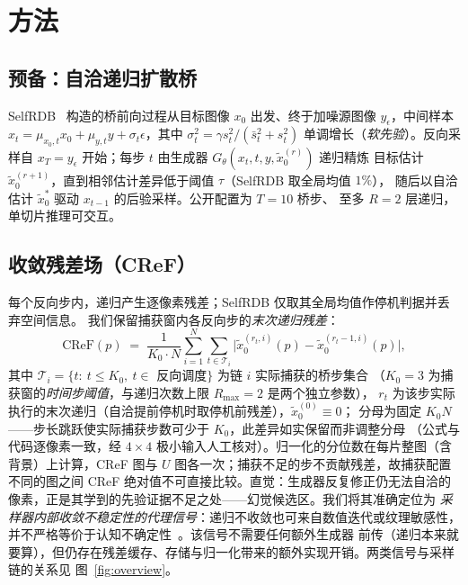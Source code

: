 \documentclass[11pt]{article}
\begin{document}


\section{方法}
\label{sec:method}

\subsection{预备：自洽递归扩散桥}
SelfRDB~\cite{arslan2025selfrdb} 构造的桥前向过程从目标图像 $x_0$ 出发、终于加噪源图像
$y_\epsilon$，中间样本 $x_t=\mu_{x_0,t}x_0+\mu_{y,t}y+\sigma_t\epsilon$，其中
$\sigma_t^2=\gamma s_t^2/(\bar s_t^2+s_t^2)$ 单调增长（\emph{软先验}）。反向采样自
$x_T=y_\epsilon$ 开始；每步 $t$ 由生成器 $G_\theta(x_t,t,y,\tilde x_0^{(r)})$ 递归精炼
目标估计 $\tilde x_0^{(r+1)}$，直到相邻估计差异低于阈值 $\tau$（SelfRDB 取全局均值 $1\%$），
随后以自洽估计 $\tilde x_0^{\ast}$ 驱动 $x_{t-1}$ 的后验采样。公开配置为 $T{=}10$ 桥步、
至多 $R{=}2$ 层递归，单切片推理可交互。

\subsection{收敛残差场（CReF）}
每个反向步内，递归产生逐像素残差；SelfRDB 仅取其全局均值作停机判据并丢弃空间信息。
我们保留捕获窗内各反向步的\emph{末次递归残差}：
\begin{equation}
  \mathrm{CReF}(p) \;=\; \frac{1}{K_0\cdot N}\sum_{i=1}^{N}\sum_{t\in\mathcal T_i}
      \bigl\lvert \tilde x_0^{(r_t,i)}(p)-\tilde x_0^{(r_t-1,i)}(p)\bigr\rvert ,
  \label{eq:cref}
\end{equation}
其中 $\mathcal T_i=\{t:\ t\le K_0,\ t\in$ 反向调度$\}$ 为链 $i$ 实际捕获的桥步集合
（$K_0{=}3$ 为捕获窗的\emph{时间步阈值}，与递归次数上限 $R_{\max}{=}2$ 是两个独立参数），
$r_t$ 为该步实际执行的末次递归（自洽提前停机时取停机前残差），$\tilde x_0^{(0)}\equiv 0$；
分母为固定 $K_0 N$——步长跳跃使实际捕获步数可少于 $K_0$，此差异如实保留而非调整分母
（公式与代码逐像素一致，经 $4\times4$ 极小输入人工核对）。归一化的分位数在每片整图（含背景）上计算，CReF 图与 $U$ 图各一次；捕获不足的步不贡献残差，故捕获配置不同的图之间 CReF 绝对值不可直接比较。直觉：生成器反复修正仍无法自洽的
像素，正是其学到的先验证据不足之处——幻觉候选区。我们将其准确定位为
\emph{采样器内部收敛不稳定性的代理信号}：递归不收敛也可来自数值迭代或纹理敏感性，
并不严格等价于认知不确定性~\cite{kendall2017uncertainties}。该信号不需要任何额外生成器
前传（递归本来就要算），但仍存在残差缓存、存储与归一化带来的额外实现开销。两类信号与采样链的关系见
图~\ref{fig:overview}。
\end{document}
